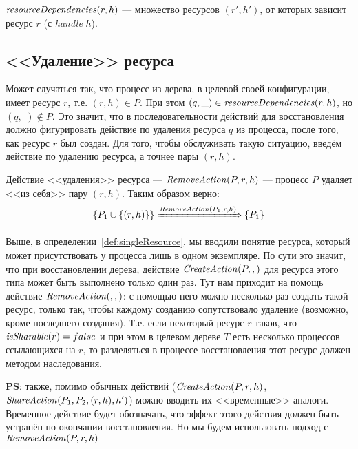 \begin{defn}
\label{def:dependsprop}
$\text{\textit{resourceDependencies}}(r, h)$ --- множество ресурсов $(r', h')$, от которых зависит ресурс $r$ (с \textit{handle} $h$).
\end{defn}

\subsection{<<Удаление>> ресурса}

Может случаться так, что процесс из дерева, в целевой своей конфигурации, имеет ресурс $r$, т.е. $(r, h) \in P$. При этом $(q, \_) \in \text{\textit{resourceDependencies}}(r, h)$, но $(q, \_) \notin P$. Это значит, что в последовательности действий для восстановления должно фигурировать действие по удаления ресурса $q$ из процесса, после того, как ресурс $r$ был создан. Для того, чтобы обслуживать такую ситуацию, введём действие по удалению ресурса, а точнее пары $(r, h)$.

\begin{defn}
\label{def:removeact}
Действие <<удаления>> ресурса --- $\text{\textit{RemoveAction}}(P, r, h)$ --- процесс $P$ удаляет <<из себя>> пару $(r, h)$. Таким образом верно:
\begin{equation*}
	\left\lbrace P_1 \cup \left\lbrace (r, h) \right\rbrace \right\rbrace \xRightarrow{\text{\textit{RemoveAction}}(P_1, r, h)} \left\lbrace P_1 \right\rbrace
\end{equation*}
\end{defn}

Выше, в определении~\ref{def:singleResource}, мы вводили понятие ресурса, который может присутствовать у процесса лишь в одном экземпляре. По сути это значит, что при восстановлении дерева, действие $\text{\textit{CreateAction}}(P, , )$ для ресурса этого типа может быть выполнено только один раз. Тут нам приходит на помощь действие $\text{\textit{RemoveAction}}(, , )$: с помощью него можно несколько раз создать такой ресурс, только так, чтобы каждому созданию сопутствовало удаление (возможно, кроме последнего создания). Т.е. если некоторый ресурс $r$ таков, что $\text{\textit{isSharable}}(r) = false$ и при этом в целевом дереве $T$ есть несколько процессов ссылающихся на $r$, то разделяться в процессе восстановления этот ресурс должен методом наследования.

\begin{note}
\textbf{PS}: также, помимо обычных действий ($\text{\textit{CreateAction}}(P, r, h)$, $\text{\textit{ShareAction}}(P_1, P_2, (r, h), h')$) можно вводить их <<временные>> аналоги. Временное действие будет обозначать, что эффект этого действия должен быть устранён по окончании восстановления. Но мы будем использовать подход с $\text{\textit{RemoveAction}}(P, r, h)$
\end{note}

